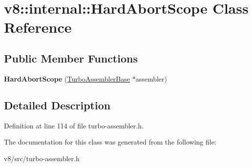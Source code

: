 \hypertarget{classv8_1_1internal_1_1HardAbortScope}{}\section{v8\+:\+:internal\+:\+:Hard\+Abort\+Scope Class Reference}
\label{classv8_1_1internal_1_1HardAbortScope}
\subsection*{Public Member Functions}
\begin{DoxyCompactItemize}
\item 
\mbox{\label{classv8_1_1internal_1_1HardAbortScope_aba8a5a4cab6ab43dff5dce008786db26}} 
{\bfseries Hard\+Abort\+Scope} (\mbox{\hyperlink{classv8_1_1internal_1_1TurboAssemblerBase}{Turbo\+Assembler\+Base}} $\ast$assembler)
\end{DoxyCompactItemize}


\subsection{Detailed Description}


Definition at line 114 of file turbo-\/assembler.\+h.



The documentation for this class was generated from the following file\+:\begin{DoxyCompactItemize}
\item 
v8/src/turbo-\/assembler.\+h\end{DoxyCompactItemize}
